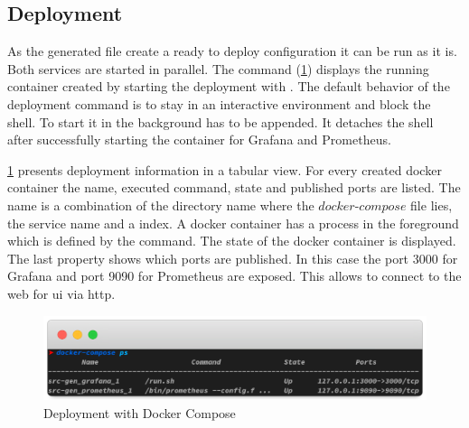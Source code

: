 \subsection{Deployment}
As the generated file create a ready to deploy configuration it can be run as it is. Both services are started in parallel. The command  (\cref{fig:deployment}) displays the running container created by starting the deployment with . The default behavior of the deployment command is to stay in an interactive environment and block the shell. To start it in the background  has to be appended. It detaches the shell after successfully starting the container for Grafana and Prometheus. 


\cref{fig:deployment} presents deployment information in a tabular view. For every created docker container the name, executed command, state and published ports are listed. The name is a combination of the directory name where the $docker\text{-}compose$ file lies, the service name and a index. A docker container has a process in the foreground which is defined by the command. The state of the docker container is displayed. The last property shows which ports are published. In this case the port 3000 for Grafana and port 9090 for Prometheus are exposed. This allows to connect to the web for \gls{ui} via \gls{http}.

\begin{figure}[!ht]
	\includegraphics[width=\linewidth]{assets/images/terminal2}
	\caption{Deployment with Docker Compose}
	\label{fig:deployment}
\end{figure}

